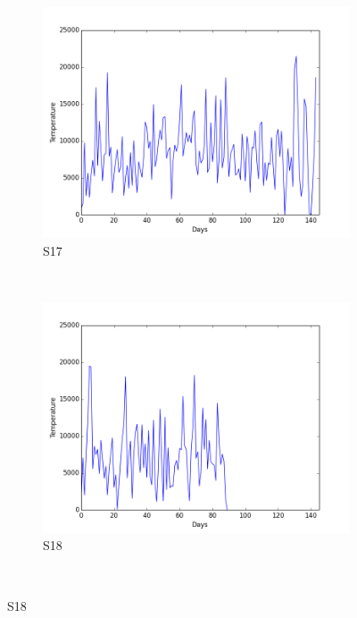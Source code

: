 \documentclass[12pt]{article} %
\begin{document}
\begin{figure}[H]
    \begin{subfigure}[b]{0.2\textwidth}
        \includegraphics[width=\textwidth]{img/graphs/17-steps-1}
        \caption{S17}
        \label{fig:s17Steps}
    \end{subfigure}
    ~ %
    \begin{subfigure}[b]{0.2\textwidth}
        \includegraphics[width=\textwidth]{img/graphs/18-steps-1}
        \caption{S18}
        \label{fig:s18Steps}
    \end{subfigure}
    ~ %

\end{figure}
\end{document}
